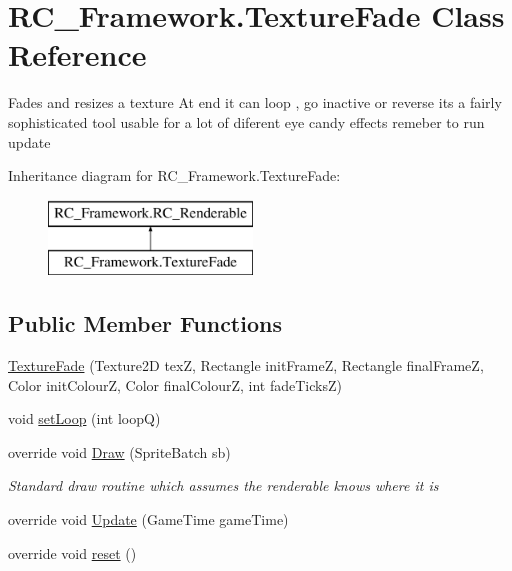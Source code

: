 \hypertarget{class_r_c___framework_1_1_texture_fade}{}\section{R\+C\+\_\+\+Framework.\+Texture\+Fade Class Reference}
\label{class_r_c___framework_1_1_texture_fade}


Fades and resizes a texture At end it can loop , go inactive or reverse its a fairly sophisticated tool usable for a lot of diferent eye candy effects remeber to run update  


Inheritance diagram for R\+C\+\_\+\+Framework.\+Texture\+Fade\+:\begin{figure}[H]
\begin{center}
\leavevmode
\includegraphics[height=2.000000cm]{class_r_c___framework_1_1_texture_fade}
\end{center}
\end{figure}
\subsection*{Public Member Functions}
\begin{DoxyCompactItemize}
\item 
\mbox{\hyperlink{class_r_c___framework_1_1_texture_fade_a0dfbfacb81bed73fb9bca98c2aafc6de}{Texture\+Fade}} (Texture2D texZ, Rectangle init\+FrameZ, Rectangle final\+FrameZ, Color init\+ColourZ, Color final\+ColourZ, int fade\+TicksZ)
\item 
void \mbox{\hyperlink{class_r_c___framework_1_1_texture_fade_a7c0fce2be107414466bc4595b9a7e116}{set\+Loop}} (int loopQ)
\item 
override void \mbox{\hyperlink{class_r_c___framework_1_1_texture_fade_ac5e515a49540f0609de47ba2f36ddc51}{Draw}} (Sprite\+Batch sb)
\begin{DoxyCompactList}\small\item\em Standard draw routine which assumes the renderable knows where it is \end{DoxyCompactList}\item 
override void \mbox{\hyperlink{class_r_c___framework_1_1_texture_fade_afa4984388423a78ef4016442e781a058}{Update}} (Game\+Time game\+Time)
\item 
override void \mbox{\hyperlink{class_r_c___framework_1_1_texture_fade_acd92f3d9604d6178ba52fb82a09967c5}{reset}} ()
\end{DoxyCompactItemize}
